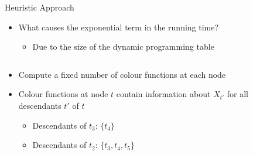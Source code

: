 \documentclass[11pt,t, usenames, dvipsnames]{beamer}
\begin{document}
\begin{frame}{Heuristic Approach}
    \begin{itemize}
        \item What causes the exponential term in the running time?
        \begin{itemize}
            \item<2-> Due to the size of the dynamic programming table
        \end{itemize}
    \end{itemize}
    
     {
        \vspace{0.5cm}
        \begin{columns}[c]
        \begin{column}{0.6\textwidth}
            \begin{itemize}
                \item Compute a fixed number of colour functions at each node
                \item Colour functions at node $t$ contain information about $X_{t'}$ for all descendants $t'$ of $t$
                \begin{itemize}
                    \item Descendants of $t_3$: $\{t_4\}$
                    \item Descendants of $t_2$: $\{t_3, t_4, t_5\}$
                \end{itemize}
            \end{itemize}
        \end{column}
        \begin{column}{0.4\textwidth}
            \centering
        \end{column}
        \end{columns}
    }
\end{frame}
\end{document}
